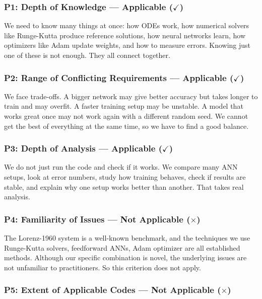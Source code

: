 \subsubsection{P1: Depth of Knowledge --- Applicable ($\checkmark$)}

We need to know many things at once: how ODEs work, how numerical solvers like Runge-Kutta produce reference solutions, how neural networks learn, how optimizers like Adam update weights, and how to measure errors. Knowing just one of these is not enough. They all connect together.

\subsubsection{P2: Range of Conflicting Requirements --- Applicable ($\checkmark$)}

We face trade-offs. A bigger network may give better accuracy but takes longer to train and may overfit. A faster training setup may be unstable. A model that works great once may not work again with a different random seed. We cannot get the best of everything at the same time, so we have to find a good balance.

\subsubsection{P3: Depth of Analysis --- Applicable ($\checkmark$)}

We do not just run the code and check if it works. We compare many ANN setups, look at error numbers, study how training behaves, check if results are stable, and explain why one setup works better than another. That takes real analysis.

\subsubsection{P4: Familiarity of Issues --- Not Applicable ($\times$)}

The Lorenz-1960 system is a well-known benchmark, and the techniques we use Runge-Kutta solvers, feedforward ANNs, Adam optimizer are all established methods. Although our specific combination is novel, the underlying issues are not unfamiliar to practitioners. So this criterion does not apply.

\subsubsection{P5: Extent of Applicable Codes --- Not Applicable ($\times$)}

